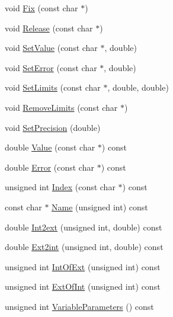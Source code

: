 \begin{DoxyCompactItemize}
\item 
void \mbox{\hyperlink{classROOT_1_1Minuit2_1_1MnApplication_aa678010fc292b1d0f4cb1761b13104c4}{Fix}} (const char $\ast$)
\item 
void \mbox{\hyperlink{classROOT_1_1Minuit2_1_1MnApplication_a399bc86275d6ea481911be4a4b48d83c}{Release}} (const char $\ast$)
\item 
void \mbox{\hyperlink{classROOT_1_1Minuit2_1_1MnApplication_af8376fc6c9a727c8f3dbdc268afb0e7e}{Set\+Value}} (const char $\ast$, double)
\item 
void \mbox{\hyperlink{classROOT_1_1Minuit2_1_1MnApplication_ac47d9b0517cbc38dc0237e4dc654a807}{Set\+Error}} (const char $\ast$, double)
\item 
void \mbox{\hyperlink{classROOT_1_1Minuit2_1_1MnApplication_a7c5404de0cf4efac550bea31f3cd4088}{Set\+Limits}} (const char $\ast$, double, double)
\item 
void \mbox{\hyperlink{classROOT_1_1Minuit2_1_1MnApplication_ae33804b5db979701f0f86b88b4124dd0}{Remove\+Limits}} (const char $\ast$)
\item 
void \mbox{\hyperlink{classROOT_1_1Minuit2_1_1MnApplication_a054caa9f6e7b2617c182b6b43b97c900}{Set\+Precision}} (double)
\item 
double \mbox{\hyperlink{classROOT_1_1Minuit2_1_1MnApplication_a0848e9b8eb22d5b23b6ba01ddcf8c135}{Value}} (const char $\ast$) const
\item 
double \mbox{\hyperlink{classROOT_1_1Minuit2_1_1MnApplication_a6997e4fd745e4048609c697f74c92eb8}{Error}} (const char $\ast$) const
\item 
unsigned int \mbox{\hyperlink{classROOT_1_1Minuit2_1_1MnApplication_a6b6e2bc386692b9e3cd8a9ad01fc175e}{Index}} (const char $\ast$) const
\item 
const char $\ast$ \mbox{\hyperlink{classROOT_1_1Minuit2_1_1MnApplication_af970f4c896be2d56b2bfb33a8e6e33c9}{Name}} (unsigned int) const
\item 
double \mbox{\hyperlink{classROOT_1_1Minuit2_1_1MnApplication_a1ca8337823e271c40f05f6da6ea8e231}{Int2ext}} (unsigned int, double) const
\item 
double \mbox{\hyperlink{classROOT_1_1Minuit2_1_1MnApplication_a8c9379939f201ea95f32a2f1de575fca}{Ext2int}} (unsigned int, double) const
\item 
unsigned int \mbox{\hyperlink{classROOT_1_1Minuit2_1_1MnApplication_a7911389abce948da10dd82a8a172afd5}{Int\+Of\+Ext}} (unsigned int) const
\item 
unsigned int \mbox{\hyperlink{classROOT_1_1Minuit2_1_1MnApplication_a61dc63d2a6320aae96867ad57918c496}{Ext\+Of\+Int}} (unsigned int) const
\item 
unsigned int \mbox{\hyperlink{classROOT_1_1Minuit2_1_1MnApplication_afc0ad887758b1609cbcae1c8b6a5a467}{Variable\+Parameters}} () const
\end{DoxyCompactItemize}
